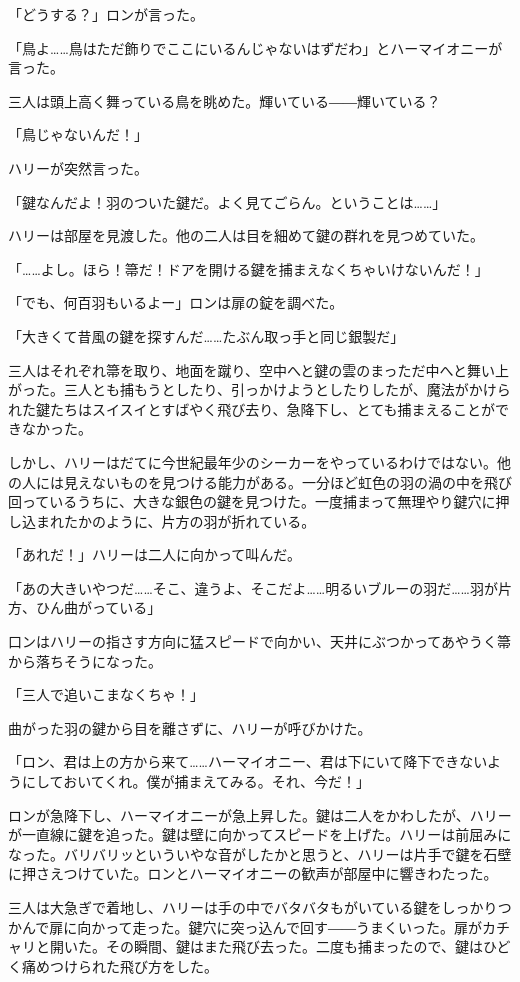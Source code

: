 \documentclass[10pt,a4paper]{article}
\begin{document}
\begin{CJK}{UTF8}{min}
「どうする？」ロンが言った。

「鳥よ……鳥はただ飾りでここにいるんじゃないはずだわ」とハーマイオニーが言った。

三人は頭上高く舞っている鳥を眺めた。輝いている――輝いている？

「鳥じゃないんだ！」

ハリーが突然言った。

「鍵なんだよ！羽のついた鍵だ。よく見てごらん。ということは……」

ハリーは部屋を見渡した。他の二人は目を細めて鍵の群れを見つめていた。

「……よし。ほら！箒だ！ドアを開ける鍵を捕まえなくちゃいけないんだ！」

「でも、何百羽もいるよー」ロンは扉の錠を調べた。

「大きくて昔風の鍵を探すんだ……たぶん取っ手と同じ銀製だ」

三人はそれぞれ箒を取り、地面を蹴り、空中へと鍵の雲のまっただ中へと舞い上がった。三人とも捕もうとしたり、引っかけようとしたりしたが、魔法がかけられた鍵たちはスイスイとすばやく飛び去り、急降下し、とても捕まえることができなかった。

しかし、ハリーはだてに今世紀最年少のシーカーをやっているわけではない。他の人には見えないものを見つける能力がある。一分ほど虹色の羽の渦の中を飛び回っているうちに、大きな銀色の鍵を見つけた。一度捕まって無理やり鍵穴に押し込まれたかのように、片方の羽が折れている。

「あれだ！」ハリーは二人に向かって叫んだ。

「あの大きいやつだ……そこ、違うよ、そこだよ……明るいブルーの羽だ……羽が片方、ひん曲がっている」

口ンはハリーの指さす方向に猛スピードで向かい、天井にぶつかってあやうく箒から落ちそうになった。

「三人で追いこまなくちゃ！」

曲がった羽の鍵から目を離さずに、ハリーが呼びかけた。

「ロン、君は上の方から来て……ハーマイオニー、君は下にいて降下できないようにしておいてくれ。僕が捕まえてみる。それ、今だ！」

ロンが急降下し、ハーマイオニーが急上昇した。鍵は二人をかわしたが、ハリーが一直線に鍵を追った。鍵は壁に向かってスピードを上げた。ハリーは前屈みになった。バリバリッといういやな音がしたかと思うと、ハリーは片手で鍵を石壁に押さえつけていた。ロンとハーマイオニーの歓声が部屋中に響きわたった。

三人は大急ぎで着地し、ハリーは手の中でバタバタもがいている鍵をしっかりつかんで扉に向かって走った。鍵穴に突っ込んで回す――うまくいった。扉がカチャリと開いた。その瞬間、鍵はまた飛び去った。二度も捕まったので、鍵はひどく痛めつけられた飛び方をした。


\end{CJK}
\end{document}
